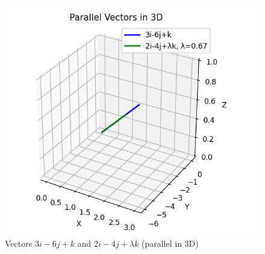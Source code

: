 \documentclass[journal]{IEEEtran}
\begin{document}
\newpage
\begin{figure}[H]
    \centering
    \includegraphics[width=0.7\columnwidth]{figs/fig.png}
    \caption{Vectors $3i-6j+k$ and $2i-4j+\lambda k$ (parallel in 3D)}
    \label{fig:Vectors}
\end{figure}
\end{document}
